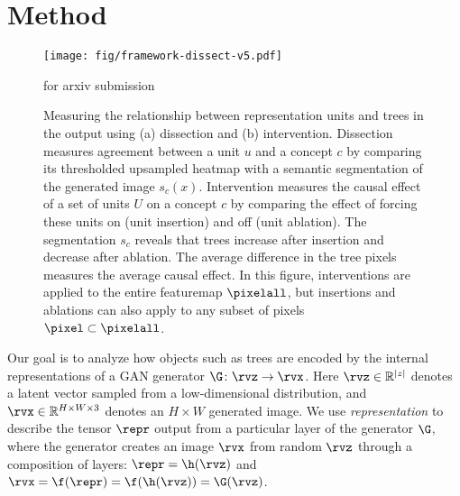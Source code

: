 \documentclass{article} %
\def\arxiv{for arxiv submission}
\begin{document}
\section{Method}\begin{figure}[t]
\centering
\vspace{-25pt}
\texttt{[image: fig/framework-dissect-v5.pdf]}%
\vspace{-10pt}
\caption{
Measuring the relationship between representation units and trees in the output using (a) dissection and (b) intervention. Dissection measures agreement between a unit $u$ and a concept $c$ by comparing its thresholded upsampled heatmap with a semantic segmentation of the generated image $s_c(x)$.  Intervention measures the causal effect of a set of units $U$ on a concept $c$ by comparing the effect of forcing these units on (unit insertion) and off (unit ablation).  The segmentation $s_c$ reveals that trees increase after insertion and decrease after ablation.  The average difference in the tree pixels measures the average causal effect. In this figure, interventions are applied to the entire featuremap $\pixelall$, but insertions and ablations can also apply to any subset of pixels $\pixel \subset \pixelall$.}
\ifdefined\arxiv
\vspace{-10pt}
\else
\vspace{-10pt}
\fi
\end{figure}
Our goal is to analyze how objects such as trees are encoded by the internal representations of a GAN generator $\G\colon \rvz\rightarrow \rvx$. Here $\rvz\in \mathbb{R}^{|z|}$ denotes a  latent vector sampled from a low-dimensional distribution, and $\rvx \in \mathbb{R}^{H\times W\times 3}$ denotes an $H\times W$ generated image.  We use \textit{representation} to describe the tensor $\repr$ output from a particular layer of the generator $\G$, where the generator creates an image $\rvx$ from random $\rvz$ through a composition of layers: $\repr = \h(\rvz)$ and $\rvx = \f(\repr) = \f(\h(\rvz)) = \G(\rvz)$.
\end{document}
